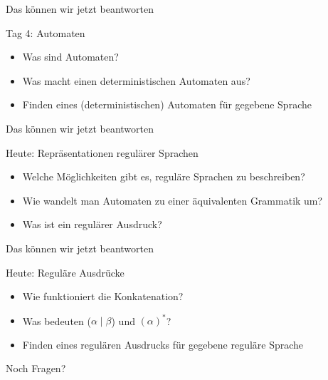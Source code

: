 \begin{frame}[fragile]{Das können wir jetzt beantworten}
	\begin{alertblock}{Tag 4: Automaten}
		\begin{itemize}
			\item Was sind Automaten?
			\item Was macht einen deterministischen Automaten aus?
			\item Finden eines (deterministischen) Automaten für gegebene Sprache
		\end{itemize}
	\end{alertblock}
\end{frame}

\begin{frame}[fragile]{Das können wir jetzt beantworten}
	\begin{alertblock}{Heute: Repräsentationen regulärer Sprachen}
		\begin{itemize}
			\item Welche Möglichkeiten gibt es, reguläre Sprachen zu beschreiben?
			\item Wie wandelt man Automaten zu einer äquivalenten Grammatik um?
			\item Was ist ein regulärer Ausdruck?
		\end{itemize}
	\end{alertblock}
\end{frame}

\begin{frame}[fragile]{Das können wir jetzt beantworten}
	\begin{alertblock}{Heute: Reguläre Ausdrücke}
		\begin{itemize}
			\item Wie funktioniert die Konkatenation?
			\item Was bedeuten ($\alpha \mid \beta$) und $(\alpha)^*$?
			\item Finden eines regulären Ausdrucks für gegebene reguläre Sprache
		\end{itemize}
	\end{alertblock}
\end{frame}

\begin{frame}[standout]
  Noch Fragen?
\end{frame}

